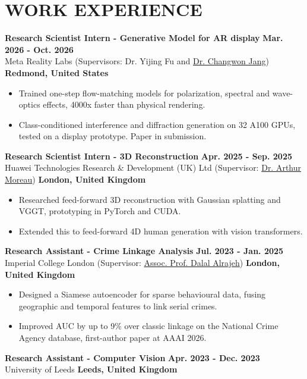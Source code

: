 \documentclass[10pt,a4paper]{article}
\begin{document}
\section*{WORK EXPERIENCE}
\textbf{Research Scientist Intern - Generative Model for AR display} \hfill \textbf{Mar. 2026 - Oct. 2026} \\
Meta Reality Labs (Supervisors: Dr. Yijing Fu and \href{https://scholar.google.com/citations?user=s2uBMgkAAAAJ}{Dr. Changwon Jang}) \hfill \textbf{Redmond, United States}
\begin{itemize}
\item Trained one-step flow-matching models for polarization, spectral and wave-optics effects, 4000x faster than physical rendering.
\item Class-conditioned interference and diffraction generation on 32 A100 GPUs, tested on a display prototype. Paper in submission.
\end{itemize}

\textbf{Research Scientist Intern - 3D Reconstruction} \hfill \textbf{Apr. 2025 - Sep. 2025} \\
Huawei Technologies Research \& Development (UK) Ltd (Supervisor: \href{https://scholar.google.com/citations?user=fMmoHX0AAAAJ}{Dr. Arthur Moreau}) \hfill \textbf{London, United Kingdom}
\begin{itemize}
\item Researched feed-forward 3D reconstruction with Gaussian splatting and VGGT, prototyping in PyTorch and CUDA.
\item Extended this to feed-forward 4D human generation with vision transformers.
\end{itemize}

\textbf{Research Assistant - Crime Linkage Analysis} \hfill \textbf{Jul. 2023 - Jan. 2025} \\
Imperial College London (Supervisor: \href{https://www.doc.ic.ac.uk/~da04/}{Assoc. Prof. Dalal Alrajeh}) \hfill \textbf{London, United Kingdom}
\begin{itemize}
\item Designed a Siamese autoencoder for sparse behavioural data, fusing geographic and temporal features to link serial crimes.
\item Improved AUC by up to 9\% over classic linkage on the National Crime Agency database, first-author paper at AAAI 2026.
\end{itemize}

\textbf{Research Assistant - Computer Vision} \hfill \textbf{Apr. 2023 - Dec. 2023} \\
University of Leeds \hfill \textbf{Leeds, United Kingdom}
\end{document}
